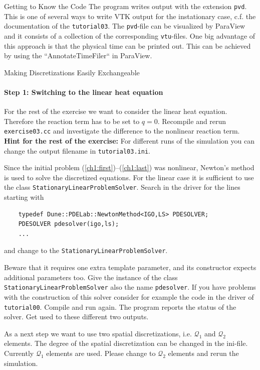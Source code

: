 \documentclass[12pt,a4paper]{article}
\begin{document}
\begin{Exercise}{Getting to Know the Code}
  The program writes output with the extension \lstinline!pvd!. This is one
  of several ways to write VTK output for the instationary case,
  c.f. the documentation of the \lstinline!tutorial03!. The
  \lstinline!pvd!-file can be visualized by ParaView and it consists of
  a collection of the corresponding \lstinline!vtu!-files.
  One big advantage of this approach is that the physical time can be
  printed out. This can be achieved by using the ``AnnotateTimeFiler``
  in ParaView.
\end{Exercise}

\begin{Exercise}{Making Discretizations Easily Exchangeable}
  \vspace{-2em}
  \paragraph{Step 1: Switching to the linear heat equation}
  For the rest of the exercise we want to consider the linear heat
  equation. Therefore the reaction term has to be set to $q =
  0$. Recompile and rerun \lstinline!exercise03.cc! and investigate the
  difference to the nonlinear reaction term. \newline
  \textbf{Hint for the rest of the exercise:} For different runs of the
  simulation you can change the output filename in
  \lstinline!tutorial03.ini!.

  Since the initial problem (\ref{ch1:first})--(\ref{ch1:last}) was
  nonlinear, Newton's method is used to solve the discretized
  equations. For the linear case it is sufficient to use the class
  \lstinline!StationaryLinearProblemSolver!. Search in the driver for
  the lines starting with
  \begin{lstlisting}
    typedef Dune::PDELab::NewtonMethod<IGO,LS> PDESOLVER;
    PDESOLVER pdesolver(igo,ls);
    ...
  \end{lstlisting}
  and change to the \lstinline!StationaryLinearProblemSolver!.

  Beware that it requires one extra template parameter, and its
  constructor expects additional parameters too. Give the instance
  of the class \mbox{\lstinline!StationaryLinearProblemSolver!} also
  the name \lstinline!pdesolver!. If you have problems with the
  construction of this solver consider for example the code in the
  driver of \lstinline!tutorial00!. Compile and run again. The program
  reports the status of the solver. Get used to these different two
  outputs.

  As a next step we want to use two spatial discretizations,
  i.e. $\mathcal{Q}_1$ and $\mathcal{Q}_2$ elements. The degree of the
  spatial discretization can be changed in the ini-file. Currently
  $\mathcal{Q}_1$ elements are used. Please change to $\mathcal{Q}_2$
  elements and rerun the simulation.


\end{Exercise}
\end{document}

